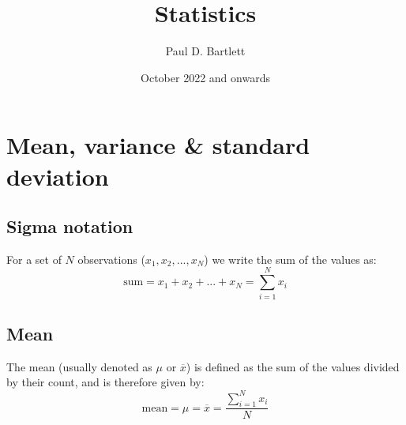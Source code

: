 \documentclass[11pt,a4paper]{article}
\title{Statistics}
\author{Paul D. Bartlett}
\date{October 2022 and onwards}
\begin{document}
\maketitle

\section{Mean, variance \& standard deviation}
\subsection{Sigma notation}
For a set of $N$ observations ($x_1, x_2, ..., x_N$) we write the sum of the values as:
\begin{equation*}
\text{sum} = x_1 + x_2 + ... + x_N = \sum_{i=1}^{N}x_i
\end{equation*}
\subsection{Mean}
The mean (usually denoted as $\mu$ or $\overline{x}$) is defined as the sum of the values divided by their count,
and is therefore given by:
\begin{equation*}
\text{mean} = \mu = \overline{x} = \frac{\sum\limits_{i=1}^{N}x_i}{N}
\end{equation*}
\end{document}
